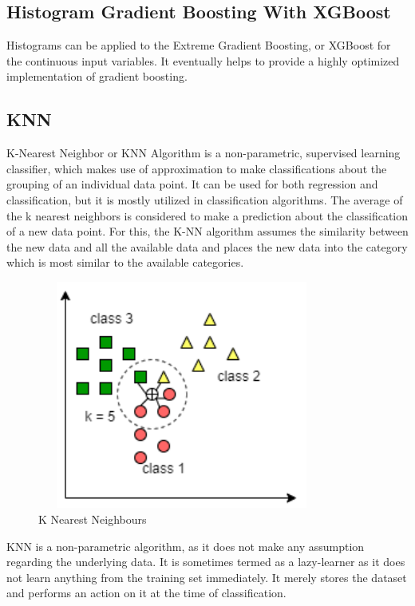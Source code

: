 \subsection{Histogram Gradient Boosting With XGBoost}
Histograms can be applied to the Extreme Gradient Boosting, or XGBoost for the continuous input variables. It eventually helps to provide a highly optimized implementation of gradient boosting.

\subsection{KNN}
K-Nearest Neighbor or KNN Algorithm is a non-parametric, supervised learning classifier, which makes use of approximation to make classifications about the grouping of an individual data point. It can be used for both regression and classification, but it is mostly utilized in classification algorithms. The average of the k nearest neighbors is considered to make a prediction about the classification of a new data point. For this, the K-NN algorithm assumes the similarity between the new data and all the available data and places the new data into the category which is most similar to the available categories.

\begin{figure}[H]
\centering
\includegraphics[width=95mm,height=75mm]{figures/knn.png}
\caption{K Nearest Neighbours}
\label{DLAccuracy}
\end{figure}

KNN is a non-parametric algorithm, as it does not make any assumption regarding the underlying data. It is sometimes termed as a lazy-learner as it does not learn anything from the training set immediately. It merely stores the dataset and performs an action on it at the time of classification.


